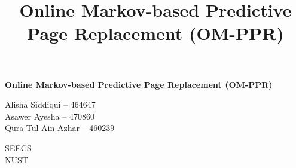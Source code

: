 \documentclass[conference]{IEEEtran}
\begin{document}
\begin{titlepage}
    \centering
    \vspace*{3cm}

    {\Huge \bfseries Online Markov-based Predictive Page Replacement (OM-PPR)\par}

    \vspace{2.5cm}

    {\large
    Alisha Siddiqui -- 464647\\[0.8em]
    Asawer Ayesha -- 470860\\[0.8em]
    Qura-Tul-Ain Azhar -- 460239\\[1.8em]
    }

    {\Large SEECS\\[0.4em]
    NUST\par}

    \vfill
\end{titlepage}

\setcounter{page}{1}

\title{Online Markov-based Predictive Page Replacement (OM-PPR)}

\maketitle
\end{document}
